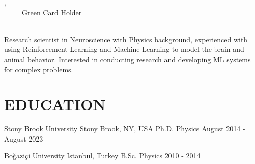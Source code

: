 \documentclass[letterpaper,11pt]{article}
\begin{document}
\nocite{*}

\begin{center}
    {\huge \myname, \mytitle}
    \\
    \vspace{2pt} 
    \faMobile \enspace
    {\myphone} ~ 
    \textbullet
    \faEnvelope \enspace
    \href{mailto:\myemail}{\color{blue}{\myemail}} ~ 
    \textbullet
    \faHome \enspace
    {\mylocation} ~ 
    \textbullet
    \faMap \enspace
    {Green Card Holder}
    \\
    \faLinkedin \enspace
    \href{https://www.linkedin.com/in/\mylinkedin}{\color{blue}{\mylinkedin}} ~
    \textbullet
    \faGithub \enspace
    \href{https://github.com/\mygithub}{\color{blue}{\mygithub}} ~
    \textbullet
    \faTwitter \enspace
    \href{https://twitter.com/bbaserdem}{ \color{blue}{bbaserdem}}
    \vspace{-7pt}
\end{center}

\begin{center}
Research scientist in Neuroscience with Physics background,
experienced with using Reinforcement Learning and Machine Learning to model the brain and animal behavior.
Interested in conducting research and developing ML systems for complex problems.

\end{center}
 
\section{EDUCATION}
  \resumeSubHeadingListStart
    \resumeSubheading
      {Stony Brook University}
      {Stony Brook, NY, USA}
      {Ph.D. Physics}
      {August 2014 - August 2023}
      \resumeItemListStart
      \resumeItemListEnd

    \vspace{-4pt}

    \resumeSubheading
      {Boğaziçi University}
      {Istanbul, Turkey}
      {B.Sc. Physics}
      {2010 - 2014}
      \resumeItemListStart
      \resumeItemListEnd
\end{document}
